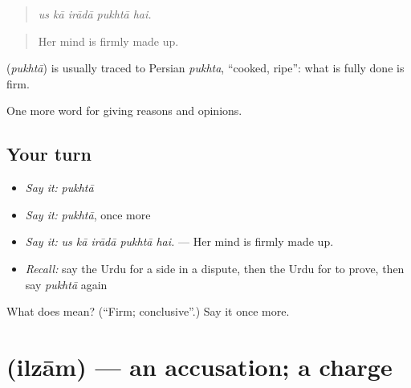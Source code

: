 \begin{quote}
    
\end{quote}

\begin{quote}
\emph{us kā irādā pukhtā hai.}
\end{quote}

\begin{quote}
Her mind is firmly made up.
\end{quote}

\begin{cousinweb}
\textbf{} (\emph{pukhtā}) is usually traced to Persian \emph{pukhta}, \textquotedblleft{}cooked, ripe\textquotedblright{}: what is fully done is firm.
\end{cousinweb}

\begin{grammarlens}[title={What you've built}]
One more word for giving reasons and opinions.
\end{grammarlens}

\subsection*{Your turn}
\begin{itemize}
\raggedright
  \item \emph{Say it:} \emph{pukhtā}
  \item \emph{Say it:} \emph{pukhtā}, once more
  \item \emph{Say it:} \emph{us kā irādā pukhtā hai.} — Her mind is firmly made up.
  \item \emph{Recall:} say the Urdu for a side in a dispute, then the Urdu for to prove, then say \emph{pukhtā} again
\end{itemize}

\begin{tcolorbox}[breakable,colback=teal!4,colframe=teal!35!black,title={Before you move on}]
What does  mean? (\textquotedblleft{}Firm; conclusive\textquotedblright{}.) Say it once more.
\end{tcolorbox}
\section[\texorpdfstring{\ur{الزام} (ilzām)}{الزام (ilzām)}]{ (ilzām) — an accusation; a charge}

\label{lesson:UR-C336-ilzam}



